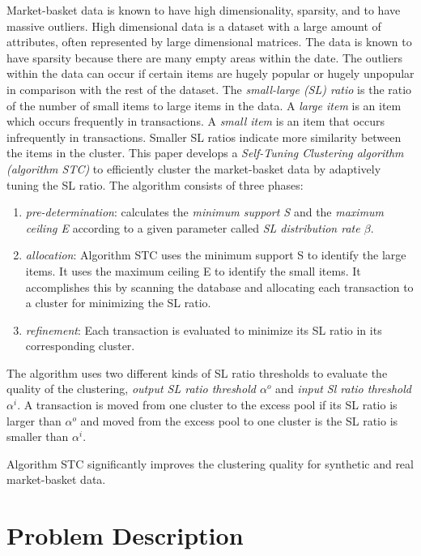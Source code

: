 \documentclass[11pt,reqno]{amsart}
\theoremstyle{definition}
\numberwithin{equation}{subsection}
\begin{document}
Market-basket data is known to have high dimensionality, sparsity, and to have massive outliers. High dimensional data is a dataset with a large amount of attributes, often represented by large dimensional matrices. The data is known to have sparsity because there are many empty areas within the date. The outliers within the data can occur if certain items are hugely popular or hugely unpopular in comparison with the rest of the dataset.  The {\em small-large (SL) ratio} is the ratio of the number of small items to large items in the data.  A {\em large item} is an item which occurs frequently in transactions. A {\em small item} is an item that occurs infrequently in transactions. Smaller SL ratios indicate more similarity between the items in the cluster. This paper develops a {\em Self-Tuning Clustering algorithm (algorithm STC)} to efficiently cluster the market-basket data by adaptively tuning the SL ratio. The algorithm consists of three phases:
	\begin{enumerate}
		\item {\em pre-determination}: calculates the {\em minimum support S} and the {\em maximum ceiling E} according to a given parameter called {\em SL distribution rate $\beta$}.
		
		\item {\em allocation}: Algorithm STC uses the minimum support S to identify the large items. It uses the maximum ceiling E to identify the small items. It accomplishes this by scanning the database and allocating each transaction to a cluster for minimizing the SL ratio.
		
		\item {\em refinement}: Each transaction is evaluated to minimize its SL ratio in its corresponding cluster. 
	\end{enumerate}
	
	The algorithm uses two different kinds of SL ratio thresholds to evaluate the quality of the clustering, {\em output SL ratio threshold $\alpha^o$} and {\em input Sl ratio threshold $\alpha^i$}. A transaction is moved from one cluster to the excess pool if its SL ratio is larger than $\alpha^o$ and moved from the excess pool to one cluster is the SL ratio is smaller than $\alpha^i$.
	
Algorithm STC significantly improves the clustering quality for synthetic and real market-basket data. 


\section{Problem Description}
\end{document}
